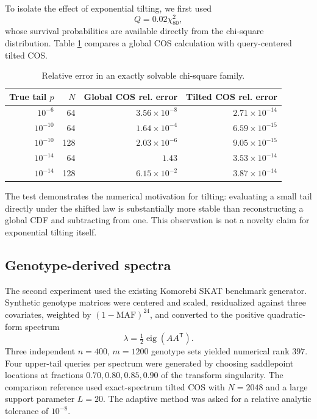 To isolate the effect of exponential tilting, we first used
\[
Q=0.02\chi^2_{80},
\]
whose survival probabilities are available directly from the chi-square distribution. Table \ref{tab:chi} compares a global COS calculation with query-centered tilted COS.

\begin{table}[htbp]
\centering
\caption{Relative error in an exactly solvable chi-square family.}
\label{tab:chi}
\begin{tabular}{rrrr}
\toprule
True tail $p$ & $N$ & Global COS rel. error & Tilted COS rel. error\\
\midrule
$10^{-6}$  & 64  & $3.56\times10^{-8}$ & $2.71\times10^{-14}$\\
$10^{-10}$ & 64  & $1.64\times10^{-4}$ & $6.59\times10^{-15}$\\
$10^{-10}$ & 128 & $2.03\times10^{-6}$ & $9.05\times10^{-15}$\\
$10^{-14}$ & 64  & $1.43$              & $3.53\times10^{-14}$\\
$10^{-14}$ & 128 & $6.15\times10^{-2}$ & $3.87\times10^{-14}$\\
\bottomrule
\end{tabular}
\end{table}

The test demonstrates the numerical motivation for tilting: evaluating a small tail directly under the shifted law is substantially more stable than reconstructing a global CDF and subtracting from one. This observation is not a novelty claim for exponential tilting itself.

\subsection{Genotype-derived spectra}

The second experiment used the existing Komorebi SKAT benchmark generator. Synthetic genotype matrices were centered and scaled, residualized against three covariates, weighted by $(1-\mathrm{MAF})^{24}$, and converted to the positive quadratic-form spectrum
\[
\lambda=\tfrac12\operatorname{eig}(AA^{\mathsf T}).
\]
Three independent $n=400$, $m=1200$ genotype sets yielded numerical rank $397$. Four upper-tail queries per spectrum were generated by choosing saddlepoint locations at fractions $0.70,0.80,0.85,0.90$ of the transform singularity. The comparison reference used exact-spectrum tilted COS with $N=2048$ and a large support parameter $L=20$. The adaptive method was asked for a relative analytic tolerance of $10^{-8}$.

